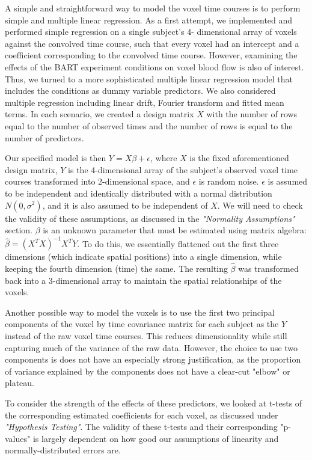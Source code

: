 \par \indent A simple and straightforward way to model the voxel time courses 
is to perform simple and multiple linear regression. As a first attempt, we 
implemented and performed simple regression on a single subject's 4-
dimensional array of voxels against the convolved time course, such that 
every voxel had an intercept and a coefficient corresponding to the convolved 
time course. However, examining the effects of the BART experiment conditions 
on voxel blood flow is also of interest. Thus, we turned to a more 
sophisticated multiple linear regression model that includes the conditions 
as dummy variable predictors. We also considered multiple regression including 
linear drift, Fourier transform and fitted mean terms. In each scenario, we 
created a design matrix $X$ with the number of rows equal to the number of 
observed times and the number of rows is equal to the number of predictors. 

Our specified model is then $Y = X\beta + \epsilon$, where $X$ is the fixed 
aforementioned design matrix, $Y$ is the 4-dimensional array of the subject's 
observed voxel time courses transformed into 2-dimensional space, and $\epsilon$ 
is random noise. $\epsilon$ is assumed to be independent and identically 
distributed with a normal distribution $N(0, \sigma^2)$, and it is also assumed 
to be independent of $X$. We will need to check the validity of these 
assumptions, as discussed in the \textit{"Normality Assumptions"} section. 
$\beta$ is an unknown parameter that must be estimated using matrix algebra: 
$\hat{\beta} = (X^T X)^{-1} X^T Y$. To do this, we essentially flattened out the 
first three dimensions (which indicate spatial positions) into a single dimension, 
while keeping the fourth dimension (time) the same. The resulting $\hat{\beta}$ 
was transformed back into a 3-dimensional array to maintain the spatial 
relationships of the voxels. 

\par Another possible way to model the voxels is to use the first two principal 
components of the voxel by time covariance matrix for each subject as the $Y$ 
instead of the raw voxel time courses. This reduces dimensionality while still 
capturing much of the variance of the raw data. However, the choice to use two 
components is does not have an especially strong justification, as the proportion 
of variance explained by the components does not have a clear-cut "elbow" or 
plateau. 

\par To consider the strength of the effects of these predictors, we looked 
at t-tests of the corresponding estimated coefficients for each voxel, as 
discussed under \textit{"Hypothesis Testing"}. The validity of these t-tests and 
their corresponding "p-values" is largely dependent on how good our assumptions 
of linearity and normally-distributed errors are. 

